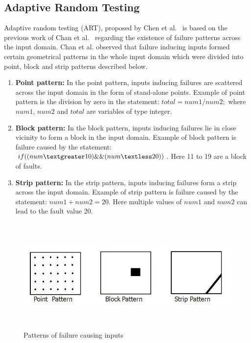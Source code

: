 \subsection{Adaptive Random Testing}
Adaptive random testing (ART), proposed by Chen et al.~\cite{Chen2008} is based on the previous work of Chan et al.~\cite{Chan1996} regarding the existence of failure patterns across the input domain. Chan et al. observed that failure inducing inputs formed certain geometrical patterns in the whole input domain which were divided into point, block and strip patterns described below.

\begin{enumerate}
\item {\bf Point pattern:} In the point pattern, inputs inducing failures are scattered across the input domain in the form of stand-alone points. Example of point pattern is the division by zero in the statement: $total = num1/num2;$ where $num1$, $num2$ and $total$ are variables of type integer.
\item {\bf Block pattern:} In the block pattern, inputs inducing failures lie in close vicinity to form a block in the input domain. Example of block pattern is failure caused by the statement: $if ( (num \textgreater 10) \&\& (num \textless 20) )$. Here 11 to 19 are a block of faults.
\item {\bf Strip pattern:} In the strip pattern, inputs inducing failures form a strip across the input domain. Example of strip pattern is failure caused by the statement: $num1 + num2 = 20$. Here multiple values of $num1$ and $num2$ can lead to the fault value 20. 
\end{enumerate}

\begin{figure}[h]
	\centering
	\includegraphics[width=13cm, height=5.7cm ]{chapter3/pointblockstrip.jpg}
	\caption{Patterns of failure causing inputs}
	\label{fig:patterns2}
\end{figure}

